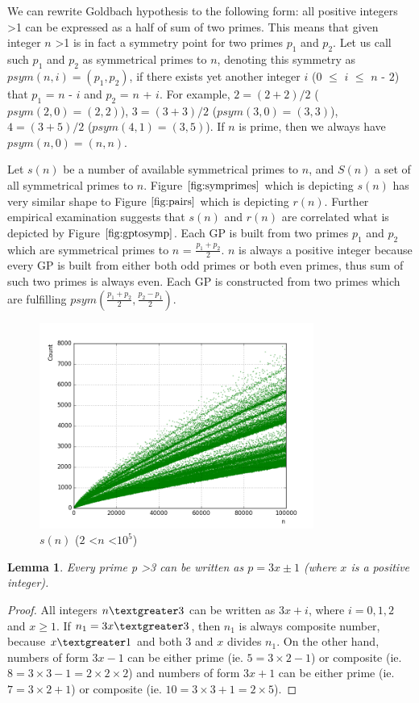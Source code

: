 \documentclass[10pt,twocolumn]{article}
\newtheorem{lemma}[theorem]{Lemma}
\begin{document}
We can rewrite Goldbach hypothesis to the following form: all positive integers \textgreater 1 can be expressed as a half of sum of two primes. This means that given integer $n$ \textgreater 1 is in fact a symmetry point for two primes $p_1$  and $p_2$. Let us call such $p_1$ and $p_2$ as symmetrical primes to $n$, denoting this symmetry as $psym(n,i) = (p_1,p_2)$, if there exists yet another integer $i$ ($0$ $\leq$ $i$ $\leq$ $n$ - $2$) that $p_1$ = $n$ - $i$ and $p_2$ = $n$ + $i$. For example, $2 = (2+2)/2$ ($psym(2,0)=(2,2)$), $3 = (3+3)/2$ ($psym(3,0)=(3,3)$), $4 = (3+5)/2$ ($psym(4,1)=(3,5)$). If $n$ is prime, then we always have $psym(n, 0)=(n,n)$. \par
Let $s(n)$ be a number of available symmetrical primes to $n$, and $S(n)$ a set of all symmetrical primes to $n$. Figure $\ref{fig:symprimes}$ which is depicting $s(n)$ has very similar shape to Figure $\ref{fig:pairs}$ which is depicting $r(n)$. Further empirical examination suggests that $s(n)$ and $r(n)$ are correlated what is depicted by Figure $\ref{fig:gptosymp}$. Each GP is built from two primes $p_1$ and $p_2$ which are symmetrical primes to $n$ = $\frac{p_1 + p_2}{2}$. $n$ is always a positive integer because every GP is built from either both odd primes or both even primes, thus sum of such two primes is always even. Each GP is constructed from two primes which are fulfilling $psym(\frac{p_1+p_2}{2}, \frac{p_2 - p_1}{2})$.\par

\begin{figure}[!ht]
\centering
\includegraphics[width=9cm]{f_checkpoint_gap_num_of_sym_primes}
\caption{$s(n)$ ($2$ \textless $n$ \textless $10^5$)}
\label{fig:symprimes}
\end{figure}

\begin{lemma}
Every prime p \textgreater 3 can be written as $p=3x \pm 1$ (where $x$ is a positive integer).
\end{lemma}
\begin{proof}
All integers $n \textgreater 3$ can be written as $3x + i$, where $i = 0, 1, 2$ and $x \geq 1$. If $n_1 = 3x \textgreater 3$, then $n_1$ is always composite number, because $x \textgreater 1$ and both $3$ and $x$ divides $n_1$. On the other hand, numbers of form $3x-1$ can be either prime (ie. $5 = 3 \times 2 - 1$) or composite (ie. $8 = 3 \times 3 -1=2 \times 2 \times 2$) and numbers of form $3x+1$ can be either prime (ie. $7 = 3 \times 2 + 1$) or composite (ie. $10 = 3 \times 3 + 1=2 \times 5$).
\end{proof}
\end{document}
